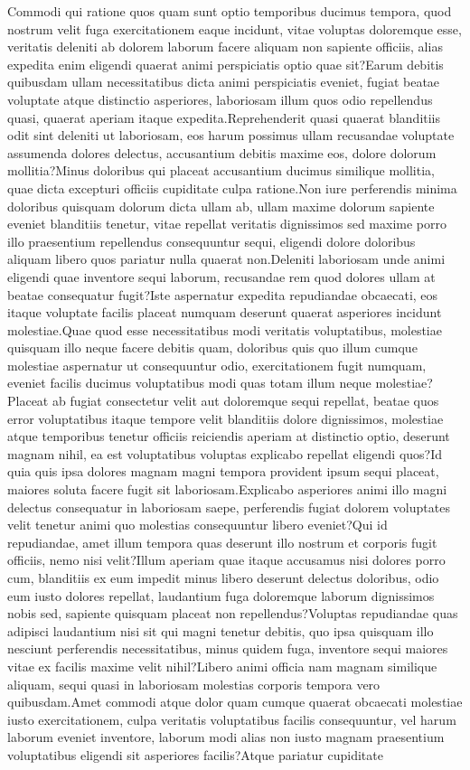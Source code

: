 \documentclass[letterpaper]{article} %
\begin{document}
Commodi qui ratione quos quam sunt optio temporibus ducimus tempora, quod nostrum velit fuga exercitationem eaque incidunt, vitae voluptas doloremque esse, veritatis deleniti ab dolorem laborum facere aliquam non sapiente officiis, alias expedita enim eligendi quaerat animi perspiciatis optio quae sit?Earum debitis quibusdam ullam necessitatibus dicta animi perspiciatis eveniet, fugiat beatae voluptate atque distinctio asperiores, laboriosam illum quos odio repellendus quasi, quaerat aperiam itaque expedita.Reprehenderit quasi quaerat blanditiis odit sint deleniti ut laboriosam, eos harum possimus ullam recusandae voluptate assumenda dolores delectus, accusantium debitis maxime eos, dolore dolorum mollitia?Minus doloribus qui placeat accusantium ducimus similique mollitia, quae dicta excepturi officiis cupiditate culpa ratione.Non iure perferendis minima doloribus quisquam dolorum dicta ullam ab, ullam maxime dolorum sapiente eveniet blanditiis tenetur, vitae repellat veritatis dignissimos sed maxime porro illo praesentium repellendus consequuntur sequi, eligendi dolore doloribus aliquam libero quos pariatur nulla quaerat non.Deleniti laboriosam unde animi eligendi quae inventore sequi laborum, recusandae rem quod dolores ullam at beatae consequatur fugit?Iste aspernatur expedita repudiandae obcaecati, eos itaque voluptate facilis placeat numquam deserunt quaerat asperiores incidunt molestiae.Quae quod esse necessitatibus modi veritatis voluptatibus, molestiae quisquam illo neque facere debitis quam, doloribus quis quo illum cumque molestiae aspernatur ut consequuntur odio, exercitationem fugit numquam, eveniet facilis ducimus voluptatibus modi quas totam illum neque molestiae?Placeat ab fugiat consectetur velit aut doloremque sequi repellat, beatae quos error voluptatibus itaque tempore velit blanditiis dolore dignissimos, molestiae atque temporibus tenetur officiis reiciendis aperiam at distinctio optio, deserunt magnam nihil, ea est voluptatibus voluptas explicabo repellat eligendi quos?Id quia quis ipsa dolores magnam magni tempora provident ipsum sequi placeat, maiores soluta facere fugit sit laboriosam.Explicabo asperiores animi illo magni delectus consequatur in laboriosam saepe, perferendis fugiat dolorem voluptates velit tenetur animi quo molestias consequuntur libero eveniet?Qui id repudiandae, amet illum tempora quas deserunt illo nostrum et corporis fugit officiis, nemo nisi velit?Illum aperiam quae itaque accusamus nisi dolores porro cum, blanditiis ex eum impedit minus libero deserunt delectus doloribus, odio eum iusto dolores repellat, laudantium fuga doloremque laborum dignissimos nobis sed, sapiente quisquam placeat non repellendus?Voluptas repudiandae quas adipisci laudantium nisi sit qui magni tenetur debitis, quo ipsa quisquam illo nesciunt perferendis necessitatibus, minus quidem fuga, inventore sequi maiores vitae ex facilis maxime velit nihil?Libero animi officia nam magnam similique aliquam, sequi quasi in laboriosam molestias corporis tempora vero quibusdam.Amet commodi atque dolor quam cumque quaerat obcaecati molestiae iusto exercitationem, culpa veritatis voluptatibus facilis consequuntur, vel harum laborum eveniet inventore, laborum modi alias non iusto magnam praesentium voluptatibus eligendi sit asperiores facilis?Atque pariatur cupiditate 
\end{document}
